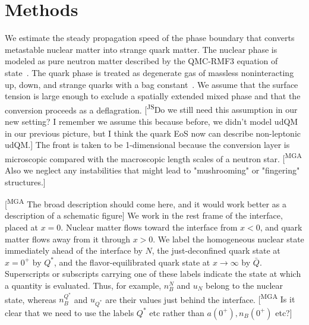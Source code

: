 \documentclass[10pt,superscriptaddress,
amsmath,aps,prc,twocolumn,nofootinbib,floatfix]{revtex4-1}
\newcommand{\mga}[1]{{\color[rgb]{0.8,0,0}#1}}
\newcommand{\mgacom}[1]{\textsf{\color[rgb]{0.7,0,0}[\textsuperscript{MGA} #1]}}
\newcommand{\JScom}[1]{\textsf{\color{violet} [\textsuperscript{JS}#1]}}
\newcommand{\Qstar}{\ensuremath{Q^*}}
\newcommand{\N}{{\ensuremath{N}}}
\newcommand{\Qbar}{{\ensuremath{\bar Q}}}
\begin{document}

\section{Methods}
\label{sec:hydro_methods}

We estimate the steady propagation speed of the phase boundary that converts metastable nuclear matter into strange quark matter.  
The nuclear phase is modeled as pure neutron matter described by the QMC-RMF3 equation of state~\cite{Alford:2022bpp,Alford:2023rgp,qmc_rmf3}.  The quark phase is treated as degenerate gas of massless \mga{noninteracting} up, down, and strange quarks with a bag constant~\cite{Chodos:1974je,Farhi:1984qu}.  
We assume that the surface tension is large enough to exclude a spatially extended mixed phase and that the conversion proceeds as a deflagration. \JScom{Do we still need this assumption in our new setting? I remember we assume this because before, we didn't model udQM in our previous picture, but I think the quark EoS now can describe non-leptonic udQM.} 
The front is taken to be 1-dimensional because the conversion layer is microscopic compared with the macroscopic length scales of a neutron star. \mgacom{Also we neglect any instabilities that might lead to "mushrooming" or "fingering" structures.}

\mgacom{The broad description should come here, and it would work better as a description of a schematic figure}
We work in the rest frame of the interface, placed at $x=0$.  Nuclear matter flows toward the interface from $x<0$, and quark matter flows away from it through $x>0$. 
We label the homogeneous nuclear state immediately ahead of the interface by $\N$, the just-deconfined quark state at $x=0^+$ by $\Qstar$, and the flavor-equilibrated quark state at $x\to\infty$ by $\Qbar$.  Superscripts
or subscripts carrying one of these labels indicate the state at which a
quantity is evaluated.  Thus, for example, $n_B^\N$ and $u_\N$ belong to
the nuclear state, whereas $n_B^{\Qstar}$ and $u_{\Qstar}$ are their values just
behind the interface.  \mgacom{Is it clear that we need to use the labels $\Qstar$ etc rather than $a(0^+), n_B(0^+)$ etc?}
\end{document}
